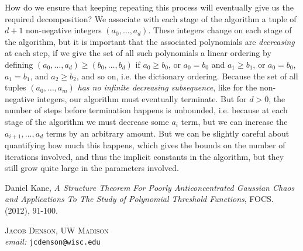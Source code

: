 \documentclass[12pt]{article}
\begin{document}
How do we ensure that keeping repeating this process will eventually give us the required decomposition? We associate with each stage of the algorithm a tuple of $d+1$ non-negative integers $(a_0,\dots,a_d)$. These integers change on each stage of the algorithm, but it is important that the associated polynomials are \emph{decreasing} at each step, if we give the set of all such polynomials a linear ordering by defining $(a_0,\dots,a_d) \geq (b_0,\dots,b_d)$ if $a_0 \geq b_0$, or $a_0 = b_0$ and $a_1 \geq b_1$, or $a_0 = b_0$, $a_1 = b_1$, and $a_2 \geq b_2$, and so on, i.e. the dictionary ordering. Because the set of all tuples $(a_0,\dots,a_m)$ \emph{has no infinite decreasing subsequence}, like for the non-negative integers, our algorithm must eventually terminate. But for $d > 0$, the number of steps before termination happens is unbounded, i.e. because at each stage of the algorithm we must decrease some $a_i$ term, but we can increase the $a_{i+1}, \dots, a_d$ terms by an arbitrary amount. But we can be slightly careful about quantifying how much this happens, which gives the bounds on the number of iterations involved, and thus the implicit constants in the algorithm, but they still grow quite large in the parameters involved.

\begin{thebibliography}{3}

    Daniel Kane,
    \emph{A Structure Theorem For Poorly Anticoncentrated Gaussian Chaos and Applications To The Study of Polynomial Threshold Functions},
    FOCS. (2012), 91-100.

\end{thebibliography}

\noindent \textsc{Jacob Denson, UW Madison}\\
\textit{email:} \texttt{jcdenson@wisc.edu}
\end{document}
